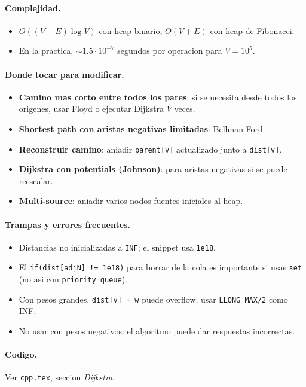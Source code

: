 \paragraph{Complejidad.}
\begin{itemize}\setlength\itemsep{0pt}
	\item $O((V + E) \log V)$ con heap binario, $O(V + E)$ con heap de Fibonacci.
	\item En la practica, $\sim 1.5 \cdot 10^{-7}$ segundos por operacion para $V = 10^5$.
\end{itemize}

\paragraph{Donde tocar para modificar.}
\begin{itemize}\setlength\itemsep{0pt}
	\item \textbf{Camino mas corto entre todos los pares}: si se necesita desde todos los origenes, usar Floyd o ejecutar Dijkstra $V$ veces.
	\item \textbf{Shortest path con aristas negativas limitadas}: Bellman-Ford.
	\item \textbf{Reconstruir camino}: aniadir \texttt{parent[v]} actualizado junto a \texttt{dist[v]}.
	\item \textbf{Dijkstra con potentials (Johnson)}: para aristas negativas si se puede reescalar.
	\item \textbf{Multi-source}: aniadir varios nodos fuentes iniciales al heap.
\end{itemize}

\paragraph{Trampas y errores frecuentes.}
\begin{itemize}\setlength\itemsep{0pt}
	\item Distancias no inicializadas a \texttt{INF}; el snippet usa \texttt{1e18}.
	\item El \texttt{if(dist[adjN] != 1e18)} para borrar de la cola es importante si usas \texttt{set} (no asi con \texttt{priority\_queue}).
	\item Con pesos grandes, \texttt{dist[v] + w} puede overflow; usar \texttt{LLONG\_MAX/2} como INF.
	\item No usar con pesos negativos: el algoritmo puede dar respuestas incorrectas.
\end{itemize}

\paragraph{Codigo.}
Ver \texttt{cpp.tex}, seccion \textit{Dijkstra}.

\vspace{0.5em}
